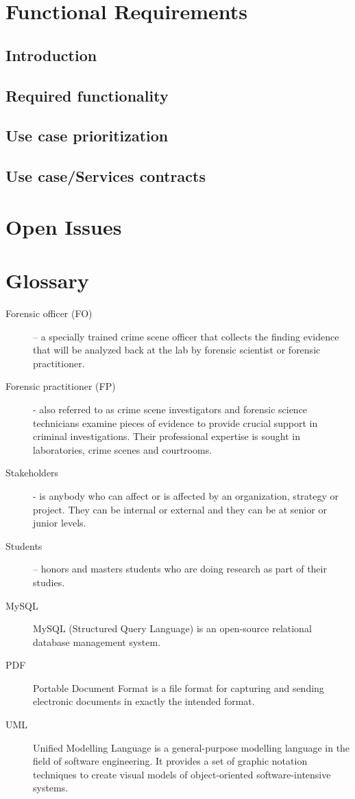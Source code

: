 \documentclass[10pt,a4paper]{article}
\begin{document}
\section{Functional Requirements}
\subsection{Introduction}


\subsection{Required functionality}




\subsection{Use case prioritization}


\subsection{Use case/Services contracts}

               
\pagebreak

\section{Open Issues}

\section{Glossary}
\begin{description}
	\item [Forensic officer (FO)] – a specially trained crime scene officer that collects the finding evidence that will be analyzed back at the lab by forensic scientist or forensic practitioner. 
	\item [Forensic practitioner (FP)] - also referred to as crime scene investigators and forensic science technicians examine pieces of evidence to provide crucial support in criminal investigations. Their professional expertise is sought in laboratories, crime scenes and courtrooms.
	\item [Stakeholders] - is anybody who can affect or is affected by an organization, strategy or project. They can be internal or external and they can be at senior or junior levels.
	\item [Students] – honors and masters students who are doing research as part of their studies.
	\item[MySQL] MySQL (Structured Query Language) is an open-source relational database management system.
	
	\item[PDF] Portable Document Format is a file format for capturing and sending electronic documents in exactly the intended format.
	\item[UML] Unified Modelling Language is a general-purpose modelling language in the field of software engineering. It provides a set of graphic notation techniques to create visual models of object-oriented software-intensive systems. 
	

\end{description}
\end{document}

